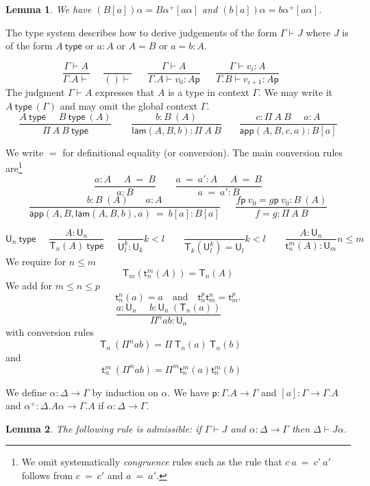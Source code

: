 \documentclass[11pt,a4paper]{article}
\newtheorem{lemma}{Lemma}[theorem]
\theoremstyle{definition}
\newcommand{\conv}{=}
\def\UU{\mathsf{U}}
\newcommand{\type}{\mathsf{type}}
\newcommand{\LAM}{\mathsf{lam}}
\newcommand{\APP}{\mathsf{app}}
\newcommand{\T}{\mathsf{T}}
\newcommand{\sT}{\mathsf{t}}
\newcommand{\pp}{\mathsf{p}}
\begin{document}
\begin{lemma}
  We have $(B[a])\alpha = B\alpha^+[a\alpha]$ and $(b[a])\alpha = b\alpha^+[a\alpha]$.
\end{lemma}


\medskip

The type system describes how to derive judgements of the form $\Gamma\vdash J$ where $J$ is of the form
$A~\type$ or $a:A$ or $A=B$ or $a=b : A$.

\medskip

$$
\frac{\Gamma\vdash A}{\Gamma.A\vdash}~~~~~~\frac{}{()\vdash}~~~~~~~
\frac{\Gamma\vdash A}{\Gamma.A\vdash v_0:A\pp}~~~~~~~
\frac{\Gamma\vdash v_i:A}{\Gamma.B\vdash v_{i+1}:A\pp}~~~~~~~
$$
The judgment $\Gamma\vdash A$ expresses that $A$ is a type in context $\Gamma$.
We may write it $A~\type~(\Gamma)$ and may omit the global context $\Gamma$.
$$
\frac{A~\type~~~~~~B~\type~(A)}{\Pi~A~B~\type}~~~~~~~~~
\frac{b:B~(A)}{\LAM(A,B,b):\Pi~A~B}~~~~~~~~
\frac{c:\Pi~A~B~~~~~~a:A}
     {\APP(A,B,c,a):B[a]}
$$

We write $\conv$ for definitional equality (or conversion).
The main conversion rules are\footnote{We omit systematically {\em congruence} rules
  such as the rule that $c~a~\conv~c'~a'$ follows from $c~\conv~c'$ and $a~\conv~a'$.}
$$
\frac{ a:A~~~~~~ A~ \conv~ B}{ a:B}~~~~~~~~~
\frac{ a ~\conv~a':A~~~~~~ A  ~\conv~ B}{ a ~\conv~a':B}
$$
$$
\frac{b:B~(A)~~~~~~~~ a:A}{ \APP(A,B,\LAM(A,B,b),a)  ~\conv~ b[a]:B[a]}
~~~~~~~
\frac{f\pp~v_0 = g\pp~v_0:B~(A)}{ f = g : \Pi~A~B}
$$


$$
\UU_n~\type~~~~~~
\frac{A:\UU_{n}}{\T_{n}(A)~\type}~~~~~~
\frac{}{\UU^{k}_l:\UU_{k}}k<l~~~~~~~~~\frac{}{\T_{k}({\UU^{k}_l}) = \UU_{l}}k<l
~~~~~~~~~\frac{A:\UU_{n}}
{\sT_{n}^{m}(A):\UU_{m}}
n\leqslant m
$$
We require for $n\leqslant m$
\[
\T_m(\sT_{n}^{m}(A)) = \T_{n}(A) 
\]
We add for $m\leqslant n\leqslant p$
$$
\sT_{n}^n(a) = a \quad\text{and}\quad \sT_{n}^p\sT_{m}^n = \sT_m^p.
$$
$$
\frac{a:\UU_{n}~~~~~~b:\UU_n~(\T_{n}(a))}
     {\Pi^{n} a b:\UU_{n}}~~~~~~~~~
$$
with conversion rules
$$
\T_{n}~(\Pi^{n} a b) = \Pi~{\T_{n}(a)}~{\T_{n}(b)}~~~~~~~
$$
and
$$
\sT_{n}^{m}~(\Pi^{n} a b) = \Pi^{m} \sT_{n}^{m}(a) \sT_{n}^{m}(b)~~~~~~
$$

 We define $\alpha:\Delta\rightarrow\Gamma$ by induction on $\alpha$.
We have $\pp:\Gamma.A\rightarrow\Gamma$ and $[a]:\Gamma\rightarrow \Gamma.A$ and
$\alpha^+:\Delta.A\alpha\rightarrow\Gamma.A$ if $\alpha:\Delta\rightarrow\Gamma$.

\begin{lemma}
  The following rule is admissible: if $\Gamma\vdash J$ and $\alpha:\Delta\rightarrow\Gamma$
  then $\Delta\vdash J\alpha$.
\end{lemma}
\end{document}
